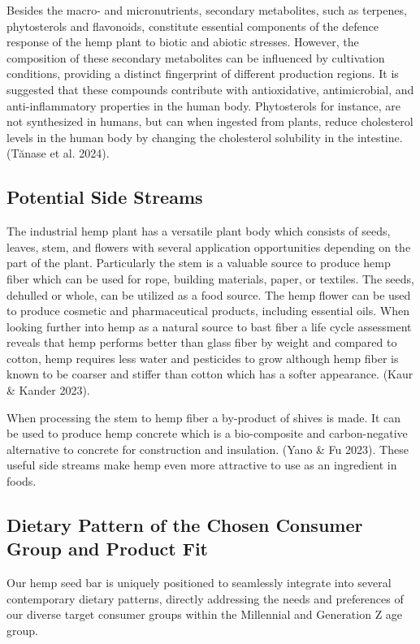 \vspace{1em}
Besides the macro- and micronutrients, secondary metabolites, such as terpenes, phytosterols and flavonoids, constitute essential components of the defence response of the hemp plant to biotic and abiotic stresses. However, the composition of these secondary metabolites can be influenced by cultivation conditions, providing a distinct fingerprint of different production regions. It is suggested that these compounds contribute with antioxidative, antimicrobial, and anti-inflammatory properties in the human body. Phytosterols for instance, are not synthesized in humans, but can when ingested from plants, reduce cholesterol levels in the human body by changing the cholesterol solubility in the intestine. (Tănase et al. 2024).

\subsection{Potential Side Streams}
The industrial hemp plant has a versatile plant body which consists of seeds, leaves, stem, and flowers with several application opportunities depending on the part of the plant. Particularly the stem is a valuable source to produce hemp fiber which can be used for rope, building materials, paper, or textiles. The seeds, dehulled or whole, can be utilized as a food source. The hemp flower can be used to produce cosmetic and pharmaceutical products, including essential oils. When looking further into hemp as a natural source to bast fiber a life cycle assessment reveals that hemp performs better than glass fiber by weight and compared to cotton, hemp requires less water and pesticides to grow although hemp fiber is known to be coarser and stiffer than cotton which has a softer appearance. (Kaur \& Kander 2023). 

\vspace{1em}
When processing the stem to hemp fiber a by-product of shives is made. It can be used to produce hemp concrete which is a bio-composite and carbon-negative alternative to concrete for construction and insulation. (Yano \& Fu 2023). These useful side streams make hemp even more attractive to use as an ingredient in foods. 

\subsection{Dietary Pattern of the Chosen Consumer Group and Product Fit}
Our hemp seed bar is uniquely positioned to seamlessly integrate into several contemporary dietary patterns, directly addressing the needs and preferences of our diverse target consumer groups within the Millennial and Generation Z age group.

